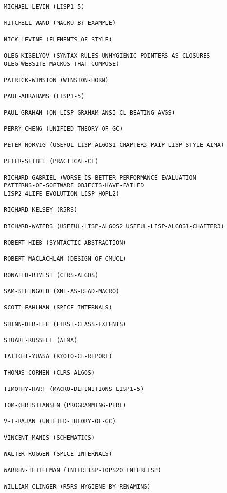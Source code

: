 \begin{verbatim}
MICHAEL-LEVIN (LISP1-5)

MITCHELL-WAND (MACRO-BY-EXAMPLE)

NICK-LEVINE (ELEMENTS-OF-STYLE)

OLEG-KISELYOV (SYNTAX-RULES-UNHYGIENIC POINTERS-AS-CLOSURES
OLEG-WEBSITE MACROS-THAT-COMPOSE)

PATRICK-WINSTON (WINSTON-HORN)

PAUL-ABRAHAMS (LISP1-5)

PAUL-GRAHAM (ON-LISP GRAHAM-ANSI-CL BEATING-AVGS)

PERRY-CHENG (UNIFIED-THEORY-OF-GC)

PETER-NORVIG (USEFUL-LISP-ALGOS1-CHAPTER3 PAIP LISP-STYLE AIMA)

PETER-SEIBEL (PRACTICAL-CL)

RICHARD-GABRIEL (WORSE-IS-BETTER PERFORMANCE-EVALUATION
PATTERNS-OF-SOFTWARE OBJECTS-HAVE-FAILED
LISP2-4LIFE EVOLUTION-LISP-HOPL2)

RICHARD-KELSEY (R5RS)

RICHARD-WATERS (USEFUL-LISP-ALGOS2 USEFUL-LISP-ALGOS1-CHAPTER3)

ROBERT-HIEB (SYNTACTIC-ABSTRACTION)

ROBERT-MACLACHLAN (DESIGN-OF-CMUCL)

RONALID-RIVEST (CLRS-ALGOS)

SAM-STEINGOLD (XML-AS-READ-MACRO)

SCOTT-FAHLMAN (SPICE-INTERNALS)

SHINN-DER-LEE (FIRST-CLASS-EXTENTS)

STUART-RUSSELL (AIMA)

TAIICHI-YUASA (KYOTO-CL-REPORT)

THOMAS-CORMEN (CLRS-ALGOS)

TIMOTHY-HART (MACRO-DEFINITIONS LISP1-5)

TOM-CHRISTIANSEN (PROGRAMMING-PERL)

V-T-RAJAN (UNIFIED-THEORY-OF-GC)

VINCENT-MANIS (SCHEMATICS)

WALTER-ROGGEN (SPICE-INTERNALS)

WARREN-TEITELMAN (INTERLISP-TOPS20 INTERLISP)

WILLIAM-CLINGER (R5RS HYGIENE-BY-RENAMING)
\end{verbatim}

